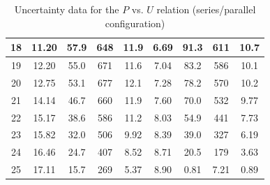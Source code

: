 \documentclass[12pt]{article}
\begin{document}
\begin{table}[H]
\begin{tabular}{|c|c|c|c|c|c|c|c|c|}
18 & 11.20    & 57.9      & 648  &11.9    & 6.69     & 91.3      & 611   &10.7   \\ \hline
19 & 12.20    & 55.0      & 671  &11.6    & 7.04     & 83.2      & 586   &10.1   \\ \hline
20 & 12.75    & 53.1      & 677  &12.1    & 7.28     & 78.2      & 570   &10.2   \\ \hline
21 & 14.14    & 46.7      & 660  &11.9    & 7.60     & 70.0      & 532   &9.77   \\ \hline
22 & 15.17    & 38.6      & 586  &11.2    & 8.03     & 54.9      & 441   &7.73   \\ \hline
23 & 15.82    & 32.0      & 506  &9.92    & 8.39     & 39.0      & 327   &6.19   \\ \hline
24 & 16.46    & 24.7      & 407  &8.52    & 8.71     & 20.5      & 179   &3.63   \\ \hline
25 & 17.11    & 15.7      & 269  &5.37    & 8.90     & 0.81      & 7.21  &0.89   \\ \hline
\end{tabular}
\caption{Uncertainty data for the $P$ vs. $U$ relation (series/parallel configuration)}
\end{table}
\end{document}
